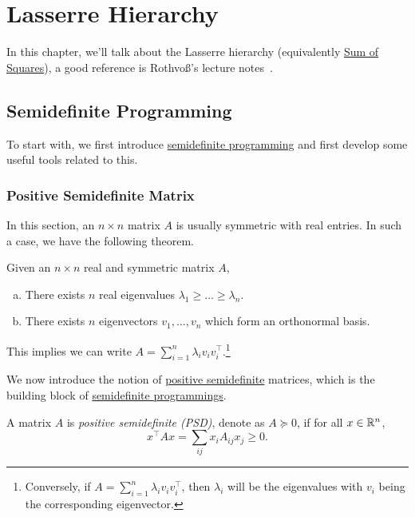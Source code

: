 \chapter{Lasserre Hierarchy}
In this chapter, we'll talk about the Lasserre hierarchy (equivalently \href{https://en.wikipedia.org/wiki/Sum-of-squares_optimization}{Sum of Squares}), a good reference is Rothvoß's lecture notes~\cite{LasserreHierarchy}.

\section{Semidefinite Programming}
To start with, we first introduce \hyperref[def:SDP]{semidefinite programming} and first develop some useful tools related to this.
\subsection{Positive Semidefinite Matrix}
In this section, an \(n\times n\) matrix \(A\) is usually symmetric with real entries. In such a case, we have the following theorem.

\begin{prev}
	Given an \(n\times n\) real and symmetric matrix \(A\),
	\begin{enumerate}[(a)]
		\item There exists \(n\) real eigenvalues \(\lambda _1 \geq \ldots \geq \lambda _n \).
		\item There exists \(n\) eigenvectors \(v_1, \ldots  , v_n\) which form an orthonormal basis.
	\end{enumerate}
	This implies we can write \(A = \sum_{i=1}^n \lambda _i v_i v_i ^{\top}\).\footnote{Conversely, if \(A= \sum_{i=1}^n \lambda _i v_i v_i ^{\top}  \), then \(\lambda _i\) will be the eigenvalues with \(v_i\) being the corresponding eigenvector.}
\end{prev}

We now introduce the notion of \hyperref[def:PSD]{positive semidefinite} matrices, which is the building block of \hyperref[def:SDP]{semidefinite programmings}.

\begin{definition}\label{def:PSD}
	A matrix \(A\) is \emph{positive semidefinite (PSD)}, denote as \(A \succeq 0\), if for all \(x\in \mathbb{\MakeUppercase{r}} ^n\),
	\[
		x^{\top} A x = \sum_{ij} x_i A_{ij} x_j \geq 0.
	\]
\end{definition}

